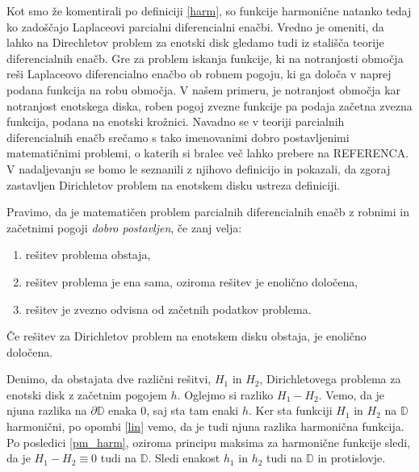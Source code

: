 \documentclass[mat1]{fmfdelo}
\begin{document}
    Kot smo že komentirali po definiciji \ref{harm}, so funkcije harmonične natanko tedaj ko zadoščajo Laplaceovi parcialni diferencialni enačbi.   
    Vredno je omeniti, da lahko na Direchletov problem za enotski disk gledamo tudi iz stališča teorije diferencialnih enačb. Gre za problem iskanja funkcije, ki na notranjosti območja reši Laplaceovo diferencialno enačbo ob robnem pogoju, ki ga določa v naprej podana funkcija na robu območja.     
    V našem primeru, je notranjost območja kar notranjost enotskega diska, roben pogoj zvezne funkcije pa podaja začetna zvezna funkcija, podana na enotski krožnici.
    Navadno se v teoriji parcialnih diferencialnih enačb srečamo s tako imenovanimi dobro postavljenimi matematičnimi problemi, o katerih si bralec več lahko prebere na REFERENCA.     
    V nadaljevanju se bomo le seznanili z njihovo definicijo in pokazali, da zgoraj zastavljen Dirichletov problem na enotskem disku ustreza definiciji. 

    \begin{definicija}[J. Hadamard, 1902]
        \label{def_dp}
        Pravimo, da je matematičen problem parcialnih diferencialnih enačb z robnimi in začetnimi pogoji \emph{dobro postavljen}, če zanj velja:
        \begin{enumerate}[label={\Alph*)}]
            \item rešitev problema obstaja,
            \item rešitev problema je ena sama, oziroma rešitev je enolično določena,
            \item rešitev je zvezno odvisna od začetnih podatkov problema.
        \end{enumerate}
    \end{definicija}

    \begin{lema}
        \label{enolicno}
        Če rešitev za Dirichletov problem na enotskem disku obstaja, je enolično določena.
    \end{lema}
    \begin{dokaz}
        Denimo, da obstajata dve različni rešitvi, $H_1$ in $H_2$, Dirichletovega problema za enotski disk z začetnim pogojem $h$.
        Oglejmo si razliko $H_1 - H_2$. Vemo, da je njuna razlika na $\partial \mathbb{D}$ enaka $0$, saj sta tam enaki $h$. Ker sta funkciji $H_1$ in $H_2$ na $\mathbb{D}$ harmonični, po opombi \ref{lin} vemo, da je tudi njuna razlika harmonična funkcija. 
        Po posledici \ref{pm_harm}, oziroma principu maksima za harmonične funkcije sledi, da je $H_1 - H_2 \equiv 0$ tudi na $\mathbb{D}$. Sledi enakost $h_1$ in $h_2$ tudi na $\mathbb{D}$ in protislovje. 
    \end{dokaz}
    
\end{document}
